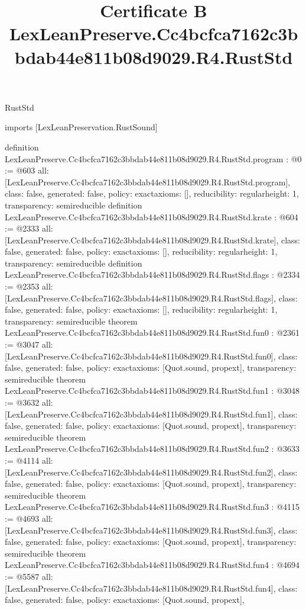\begin{lexlean}{RustStd}
\title{Certificate B LexLeanPreserve.Cc4bcfca7162c3bbdab44e811b08d9029.R4.RustStd}
\begin{coremodule}
imports [LexLeanPreservation.RustSound]

definition LexLeanPreserve.Cc4bcfca7162c3bbdab44e811b08d9029.R4.RustStd.program : @0 := @603 {
  all: [LexLeanPreserve.Cc4bcfca7162c3bbdab44e811b08d9029.R4.RustStd.program],
  class: false,
  generated: false,
  policy: exact{axioms: []},
  reducibility: regular{height: 1},
  transparency: semireducible
}
definition LexLeanPreserve.Cc4bcfca7162c3bbdab44e811b08d9029.R4.RustStd.krate : @604 := @2333 {
  all: [LexLeanPreserve.Cc4bcfca7162c3bbdab44e811b08d9029.R4.RustStd.krate],
  class: false,
  generated: false,
  policy: exact{axioms: []},
  reducibility: regular{height: 1},
  transparency: semireducible
}
definition LexLeanPreserve.Cc4bcfca7162c3bbdab44e811b08d9029.R4.RustStd.flags : @2334 := @2353 {
  all: [LexLeanPreserve.Cc4bcfca7162c3bbdab44e811b08d9029.R4.RustStd.flags],
  class: false,
  generated: false,
  policy: exact{axioms: []},
  reducibility: regular{height: 1},
  transparency: semireducible
}
theorem LexLeanPreserve.Cc4bcfca7162c3bbdab44e811b08d9029.R4.RustStd.fun0 : @2361 := @3047 {
  all: [LexLeanPreserve.Cc4bcfca7162c3bbdab44e811b08d9029.R4.RustStd.fun0],
  class: false,
  generated: false,
  policy: exact{axioms: [Quot.sound, propext]},
  transparency: semireducible
}
theorem LexLeanPreserve.Cc4bcfca7162c3bbdab44e811b08d9029.R4.RustStd.fun1 : @3048 := @3632 {
  all: [LexLeanPreserve.Cc4bcfca7162c3bbdab44e811b08d9029.R4.RustStd.fun1],
  class: false,
  generated: false,
  policy: exact{axioms: [Quot.sound, propext]},
  transparency: semireducible
}
theorem LexLeanPreserve.Cc4bcfca7162c3bbdab44e811b08d9029.R4.RustStd.fun2 : @3633 := @4114 {
  all: [LexLeanPreserve.Cc4bcfca7162c3bbdab44e811b08d9029.R4.RustStd.fun2],
  class: false,
  generated: false,
  policy: exact{axioms: [Quot.sound, propext]},
  transparency: semireducible
}
theorem LexLeanPreserve.Cc4bcfca7162c3bbdab44e811b08d9029.R4.RustStd.fun3 : @4115 := @4693 {
  all: [LexLeanPreserve.Cc4bcfca7162c3bbdab44e811b08d9029.R4.RustStd.fun3],
  class: false,
  generated: false,
  policy: exact{axioms: [Quot.sound, propext]},
  transparency: semireducible
}
theorem LexLeanPreserve.Cc4bcfca7162c3bbdab44e811b08d9029.R4.RustStd.fun4 : @4694 := @5587 {
  all: [LexLeanPreserve.Cc4bcfca7162c3bbdab44e811b08d9029.R4.RustStd.fun4],
  class: false,
  generated: false,
  policy: exact{axioms: [Quot.sound, propext]},
}
\end{coremodule}
\end{lexlean}
